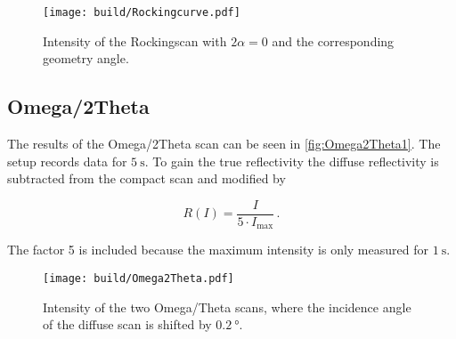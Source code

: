 \begin{figure}[H]
    \centering
    \texttt{[image: build/Rockingcurve.pdf]}
    \caption{Intensity of the Rockingscan with $2\alpha = 0$ and the corresponding geometry angle.} 
    \label{fig:Rockingscan}
\end{figure}

\subsection{Omega/2Theta}

The results of the Omega/2Theta scan can be seen in \autoref{fig:Omega2Theta1}. 
The setup records data for $ \SI{5}{\second}$.
To gain the true reflectivity the diffuse reflectivity is subtracted from the compact scan and modified by

\begin{equation*}
    R(I) =   \frac{I}{5 \cdot I_\text{max}}\,.
\end{equation*}

The factor 5 is included because the maximum intensity is only measured for $\SI{1}{\second}$.



\begin{figure}[H]
    \centering
    \texttt{[image: build/Omega2Theta.pdf]}
    \caption{Intensity of the two Omega/Theta scans, where the incidence angle of the diffuse scan is shifted by $\SI{0.2}{\degree}$.} 
    \label{fig:Omega2Theta1}
\end{figure}
